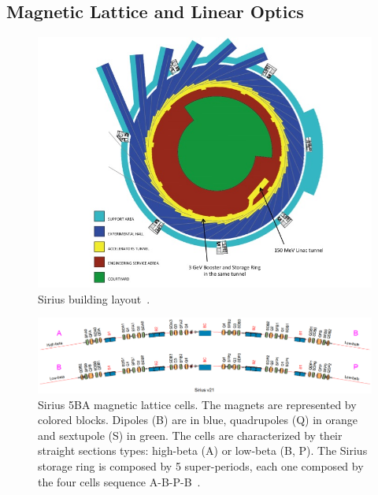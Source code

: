 \subsection{Magnetic Lattice and Linear Optics}
\begin{figure}
    \centering
    \includegraphics[scale=0.5]{figures/sirius_building.jpg}
    \caption{Sirius building layout~\cite{wiki}.}
    \label{fig:sirius_building}
\end{figure}
\begin{figure}
    \centering
    \includegraphics[scale=0.23, trim={0 2cm 0 0}, clip]{figures/sirius_lattice.png}
    \caption{Sirius 5BA magnetic lattice cells. The magnets are represented by colored blocks. Dipoles (B) are in blue, quadrupoles (Q) in orange and sextupole (S) in green. The cells are characterized by their straight sections types: high-beta (A) or low-beta (B, P). The Sirius storage ring is composed by 5 super-periods, each one composed by the four cells sequence A-B-P-B~\cite{wiki}.}
    \label{fig:sirius_lattice}
\end{figure}
